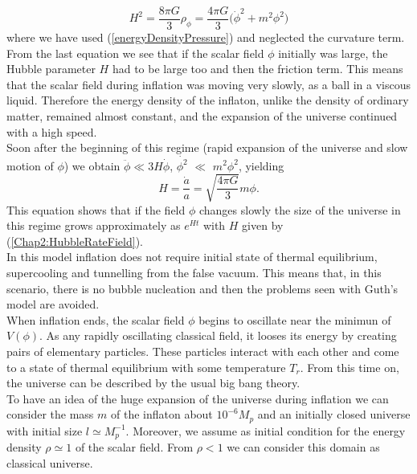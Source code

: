 \documentclass[11pt,a4paper,twoside]{book}
\begin{document}
\begin{equation}
	\label{Chap2:friedmannChaoticInflation}
	H^{2}=\frac{8 \pi G}{3}\rho_{\phi}= \frac{4 \pi G}{3}\Big (\dot{\phi}^{2} + m^{2}\phi^{2} \Big )
\end{equation}
where we have used (\ref{energyDensityPressure}) and neglected the curvature term.\\
From the last equation we see that if the scalar field $\phi$ initially was large, the Hubble parameter $ H $ had to be large too and then the friction term. This means that the scalar field during inflation was moving very slowly, as a ball in a viscous liquid. Therefore the energy density of the inflaton, unlike the density of ordinary matter, remained almost constant, and the expansion of the universe continued with a high speed. \\
Soon after the beginning of this regime (rapid expansion of the universe and slow motion of $\phi$) we obtain $ \ddot{\phi} \ll 3H\dot{\phi} $, $\dot{\phi^{2}}$ $\ll$ $ m^{2}\phi^{2} $, yielding
\begin{equation}
	\label{Chap2:HubbleRateField}
	H=\frac{\dot{a}}{a} =\sqrt{\frac{4\pi G}{3}}m\phi.
\end{equation}
 This equation shows that if the field $\phi$ changes slowly the size of the universe in this regime grows approximately as $ e^{H t} $ with $ H $ given by (\ref{Chap2:HubbleRateField}). \\
 In this model inflation does not require initial state of thermal equilibrium, supercooling and tunnelling from the false vacuum. This means that, in this scenario, there is no bubble nucleation and then the problems seen with Guth's model are avoided.\\
 When inflation ends, the scalar field $\phi$ begins to oscillate near the minimun of $ V(\phi) $. As any rapidly oscillating classical field, it looses its energy by creating pairs of elementary particles. These particles interact with each other and come to a state of thermal equilibrium with some temperature $ T_{r} $. From this time on, the universe can be described by the usual big bang theory.\\
 To have an idea of the huge expansion of the universe during inflation we can consider the mass $ m $ of the inflaton about $ 10^{-6} M_{p} $ and an initially closed universe with initial size $ l \simeq M_{p}^{-1} $. Moreover, we assume as initial condition for the energy density $\rho \simeq 1$ of the scalar field. From $\rho < 1$ we can consider this domain as classical universe.\\
\end{document}
